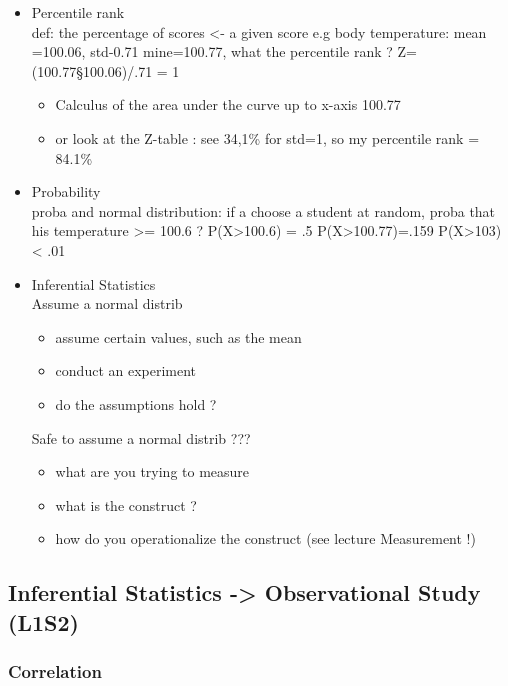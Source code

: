 \documentclass[11pt]{article}
\begin{document}
\begin{itemize}
\begin{itemize}
\begin{itemize}
\item Percentile rank\\
\label{sec-1-1-3-3-1-3}%
def: the percentage of scores <- a given score
       e.g body temperature: mean =100.06, std-0.71
           mine=100.77, what the percentile rank ?
       Z=(100.77§100.06)/.71 = 1
\begin{itemize}
\item Calculus of the area under the curve up to x-axis 100.77
\item or look at the Z-table : see 34,1\% for std=1, so my percentile rank = 84.1\%
\end{itemize}

\item Probability\\
\label{sec-1-1-3-3-1-4}%
proba and normal distribution:
       if a choose a student at random, proba that his temperature >= 100.6 ?
       P(X>100.6) = .5
       P(X>100.77)=.159
       P(X>103) < .01

\item Inferential Statistics\\
\label{sec-1-1-3-3-1-5}%
Assume a normal distrib
\begin{itemize}
\item assume certain values, such as the mean
\item conduct an experiment
\item do the assumptions hold ?
\end{itemize}
       Safe to assume a normal distrib ???
\begin{itemize}
\item what are you trying to measure
\item what is the construct ?
\item how do you operationalize the construct (see lecture Measurement !)
\end{itemize}
      

\end{itemize} %
\end{itemize} %
\end{itemize} %
\subsection{Inferential Statistics -> Observational Study (L1S2)}
\label{sec-1-2}
\subsubsection{Correlation}
\label{sec-1-2-1}
\end{document}
